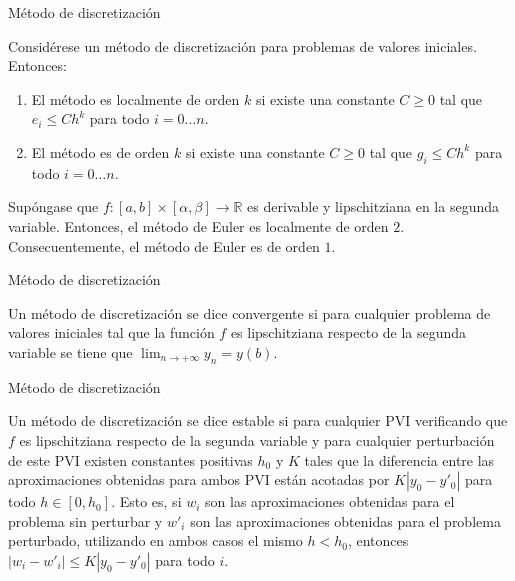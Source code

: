 		\begin{frame}{Método de discretización}
			\fontsize{11}{11}\selectfont
			\begin{definition}
				Considérese un método de discretización para problemas de valores iniciales. Entonces:
				\begin{enumerate}
					\item El método es localmente de orden $k$ si existe una constante $C \ge 0$ tal que $e_i \le C h^k$ para todo $i = 0 \ldots n$.
					\item El método es de orden $k$ si existe una constante $C \ge 0$ tal que $g_i \le C h^k$ para todo $i = 0 \ldots n$.
				\end{enumerate}
			\end{definition}
			
			\begin{theorem} \label{theorem:euler:error}
				Supóngase que $f: [a,b] \times [\alpha, \beta] \rightarrow \mathbb{R}$ es derivable y lipschitziana en la segunda variable. Entonces, el método de Euler es localmente de orden $2$. Consecuentemente, el método de Euler es de orden $1$.
			\end{theorem}	
		\end{frame}
			
		\begin{frame}{Método de discretización}		
			\begin{definition}
				Un método de discretización se dice convergente si para cualquier problema de valores iniciales tal que la función $f$ es lipschitziana respecto de la segunda variable se tiene que $\lim_{n \rightarrow +\infty} y_n = y(b)$.
			\end{definition}
		\end{frame}	
			
		\begin{frame}{Método de discretización}
			\begin{definition}
				Un método de discretización se dice estable si para cualquier PVI verificando que $f$ es lipschitziana respecto de la segunda variable y para cualquier perturbación de este PVI existen constantes positivas $h_0$ y $K$ tales que la diferencia entre las aproximaciones obtenidas para ambos PVI están acotadas por $K |y_0 - y'_0|$ para todo $h \in [0,h_0]$. Esto es, si $w_i$ son las aproximaciones obtenidas para el problema sin perturbar y $w'_i$ son las aproximaciones obtenidas para el problema perturbado, utilizando en ambos casos el mismo $h < h_0$, entonces $\left|w_i - w'_i\right| \le K |y_0 - y'_0|$ para todo $i$.
			\end{definition}
		\end{frame}
		
